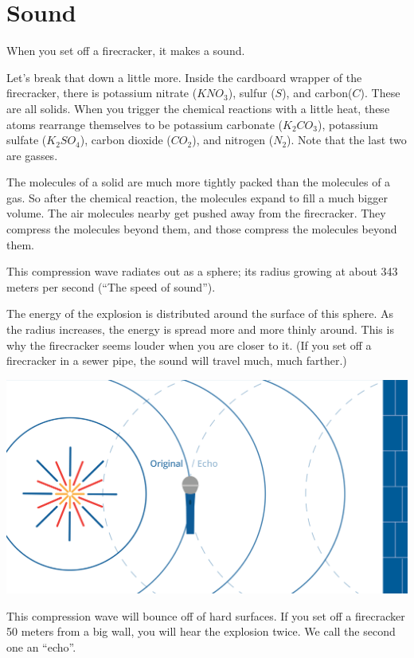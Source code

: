 \chapter{Sound}

When you set off a firecracker, it makes a sound.

Let's break that down a little more. Inside the cardboard wrapper of
the firecracker, there is potassium nitrate ($KNO_3$), sulfur ($S$),
and carbon($C$).  These are all solids. When you trigger the chemical
reactions with a little heat, these atoms rearrange themselves to be
potassium carbonate ($K_2CO_3$), potassium sulfate ($K_2SO_4$), carbon
dioxide ($CO_2$), and nitrogen ($N_2$). Note that the last two are
gasses.

The molecules of a solid are much more tightly packed than the
molecules of a gas. So after the chemical reaction, the molecules
expand to fill a much bigger volume. The air molecules nearby get
pushed away from the firecracker.  They compress the molecules beyond
them, and those compress the molecules beyond them.

This compression wave radiates out as a sphere; its radius growing at
about 343 meters per second (``The speed of sound'').

The energy of the explosion is distributed around the surface of this
sphere. As the radius increases, the energy is spread more and more
thinly around. This is why the firecracker seems louder when you are
closer to it. (If you set off a firecracker in a sewer pipe, the sound
will travel much, much farther.)

\includegraphics[width=1\textwidth]{firecracker.png}


This compression wave will bounce off of hard surfaces. If you set off
a firecracker 50 meters from a big wall, you will hear the explosion
twice. We call the second one an ``echo''.

